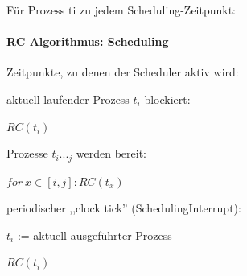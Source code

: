 \documentclass[a4paper]{article}
\begin{document}
\begin{multicols}{3}
    Für Prozess ti zu jedem Scheduling-Zeitpunkt:



    \paragraph{RC Algorithmus: Scheduling}

    Zeitpunkte, zu denen der Scheduler aktiv wird:

    \begin{enumerate*}
        \item aktuell laufender Prozess $t_i$ blockiert:
        \begin{itemize*}
            \item $RC(t_i)$
        \end{itemize*}
        \item Prozesse $t_i..._j$ werden bereit:
        \begin{itemize*}
            \item $for\ x\in[i,j]: RC(t_x)$
        \end{itemize*}
        \item periodischer ,,clock tick'' (SchedulingInterrupt):
        \begin{itemize*}
            \item $t_i$ := aktuell ausgeführter Prozess
            \item $RC(t_i)$
        \end{itemize*}
    \end{enumerate*}


\end{multicols}
\end{document}
